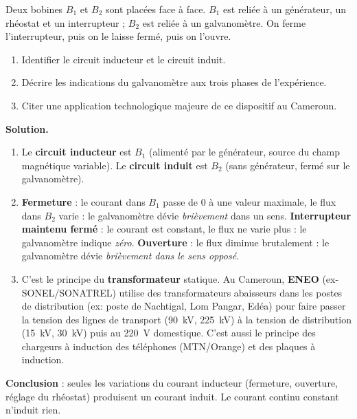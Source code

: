 \documentclass[11pt]{article}
\begin{document}
\begin{exoresolu}
Deux bobines $B_1$ et $B_2$ sont placées face à face. $B_1$ est reliée à un générateur, un rhéostat et un interrupteur ; $B_2$ est reliée à un galvanomètre. On ferme l'interrupteur, puis on le laisse fermé, puis on l'ouvre.
\begin{enumerate}
\item Identifier le circuit inducteur et le circuit induit.
\item Décrire les indications du galvanomètre aux trois phases de l'expérience.
\item Citer une application technologique majeure de ce dispositif au Cameroun.
\end{enumerate}
\tcblower
\textbf{Solution.}
\begin{enumerate}
\item Le \textbf{circuit inducteur} est $B_1$ (alimenté par le générateur, source du champ magnétique variable). Le \textbf{circuit induit} est $B_2$ (sans générateur, fermé sur le galvanomètre).
\item \textbf{Fermeture} : le courant dans $B_1$ passe de 0 à une valeur maximale, le flux dans $B_2$ varie : le galvanomètre dévie \emph{brièvement} dans un sens. \textbf{Interrupteur maintenu fermé} : le courant est constant, le flux ne varie plus : le galvanomètre indique \emph{zéro}. \textbf{Ouverture} : le flux diminue brutalement : le galvanomètre dévie \emph{brièvement dans le sens opposé}.
\item C'est le principe du \textbf{transformateur} statique. Au Cameroun, \textbf{ENEO} (ex-SONEL/SONATREL) utilise des transformateurs abaisseurs dans les postes de distribution (ex: poste de Nachtigal, Lom Pangar, Edéa) pour faire passer la tension des lignes de transport (\SI{90}{kV}, \SI{225}{kV}) à la tension de distribution (\SI{15}{kV}, \SI{30}{kV}) puis au \SI{220}{V} domestique. C'est aussi le principe des chargeurs à induction des téléphones (MTN/Orange) et des plaques à induction.
\end{enumerate}
\textbf{Conclusion} : seules les variations du courant inducteur (fermeture, ouverture, réglage du rhéostat) produisent un courant induit. Le courant continu constant n'induit rien.
\end{exoresolu}
\end{document}
